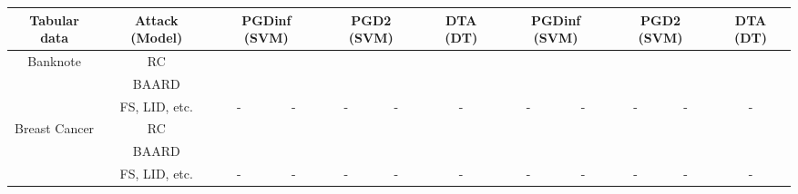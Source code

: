 \documentclass[varwidth=\maxdimen]{standalone}
\begin{document}
\begin{table}
\begin{tabular}{@{\hskip2pt}c@{\hskip2pt}|c|ccccc|ccccc}
        \bottomrule
        \toprule
        \textbf{Tabular data}                      & Attack (Model)                        & \multicolumn{2}{c}{PGDinf (SVM)} & \multicolumn{2}{c}{PGD2 (SVM)}    & DTA (DT)                & \multicolumn{2}{c}{PGDinf (SVM)} & \multicolumn{2}{c}{PGD2 (SVM)} & DTA (DT)                                                                                              \\
        \midrule
        \multirow{3}{*}{Banknote}                  & RC                                    &                                  &                                   &                         &                                  &                                &                         &                  &                   &                  &                   \\
                                                   & BAARD                                 &                                  &                                   &                         &                                  &                                &                         &                  &                   &                  &                   \\
                                                   & FS, LID, etc.                         & -                                & -                                 & -                       & -                                & -                              & -                       & -                & -                 & -                & -                 \\
        \midrule
        \multirow{3}{*}{Breast Cancer}             & RC                                    &                                  &                                   &                         &                                  &                                &                         &                  &                   &                  &                   \\
                                                   & BAARD                                 &                                  &                                   &                         &                                  &                                &                         &                  &                   &                  &                   \\
                                                   & FS, LID, etc.                         & -                                & -                                 & -                       & -                                & -                              & -                       & -                & -                 & -                & -                 \\
        \bottomrule
    \end{tabular}
\end{table}
\end{document}
